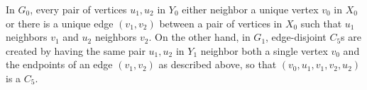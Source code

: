 In $G_0$, every pair of vertices $u_1,u_2$ in $Y_0$ either neighbor a unique vertex $v_0$ in $X_0$ or there is a unique edge $(v_1,v_2)$ between a pair of vertices in $X_0$ such that $u_1$ neighbors $v_1$ and $u_2$ neighbors $v_2$.
On the other hand, in $G_1$, edge-disjoint $C_5$s are created by having the same pair $u_1,u_2$ in $Y_1$ neighbor both a single vertex $v_0$ and the endpoints of an edge $(v_1,v_2)$ as described above, so that $(v_0,u_1,v_1,v_2,u_2)$ is a $C_5$.


